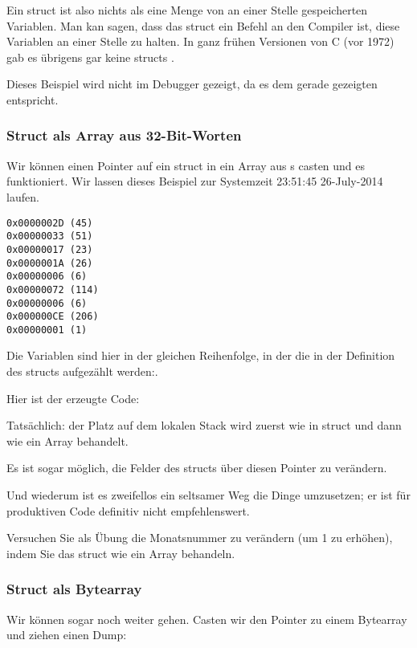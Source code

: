 Ein struct ist also nichts als eine Menge von an einer Stelle gespeicherten Variablen.
Man kan sagen, dass das struct ein Befehl an den Compiler ist, diese Variablen an einer Stelle zu halten.
In ganz frühen Versionen von C (vor 1972) gab es übrigens gar keine structs \RitchieDevC.

Dieses Beispiel wird nicht im Debugger gezeigt, da es dem gerade gezeigten entspricht.

\subsubsection{Struct als Array aus 32-Bit-Worten}


Wir können einen Pointer auf ein struct in ein Array aus \Tint{}s casten und es funktioniert.
Wir lassen dieses Beispiel zur Systemzeit 23:51:45 26-July-2014 laufen.

\begin{lstlisting}[label=GCC_tm3_output]
0x0000002D (45)
0x00000033 (51)
0x00000017 (23)
0x0000001A (26)
0x00000006 (6)
0x00000072 (114)
0x00000006 (6)
0x000000CE (206)
0x00000001 (1)
\end{lstlisting}
Die Variablen sind hier in der gleichen Reihenfolge, in der die in der Definition des structs aufgezählt
werden:.

Hier ist der erzeugte Code:


Tatsächlich: der Platz auf dem lokalen Stack wird zuerst wie in struct und dann wie ein Array behandelt.

Es ist sogar möglich, die Felder des structs über diesen Pointer zu verändern.

Und wiederum ist es zweifellos ein seltsamer Weg die Dinge umzusetzen; er ist für produktiven Code definitiv nicht
empfehlenswert.

\mysubparagraph{\Exercise}
Versuchen Sie als Übung die Monatsnummer zu verändern (um 1 zu erhöhen), indem Sie das struct wie ein Array behandeln.

\subsubsection{Struct als Bytearray}
Wir können sogar noch weiter gehen. Casten wir den Pointer zu einem Bytearray und ziehen einen Dump:

